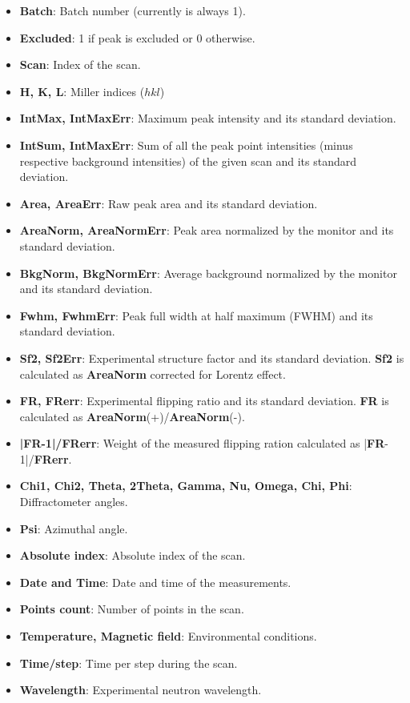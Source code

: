 \begin{itemize}
	\item \textbf{Batch}: Batch number (currently is always 1).
	\item \textbf{Excluded}: 1 if peak is excluded or 0 otherwise.
	\item \textbf{Scan}: Index of the scan.
	\item \textbf{H, K, L}: Miller indices ($hkl$)
	\item \textbf{IntMax, IntMaxErr}: Maximum peak intensity and its standard deviation.
	\item \textbf{IntSum, IntMaxErr}: Sum of all the peak point intensities (minus respective background intensities) of the given scan and its standard deviation.
	\item \textbf{Area, AreaErr}: Raw peak area and its standard deviation.
	\item \textbf{AreaNorm, AreaNormErr}: Peak area normalized by the monitor and its standard deviation.
	\item \textbf{BkgNorm, BkgNormErr}: Average background normalized by the monitor and its standard deviation.
	\item \textbf{Fwhm, FwhmErr}: Peak full width at half maximum (FWHM) and its standard deviation.
	\item \textbf{Sf2, Sf2Err}: Experimental structure factor and its standard deviation. \textbf{Sf2} is calculated as \textbf{AreaNorm} corrected for Lorentz effect.
	\item \textbf{FR, FRerr}: Experimental flipping ratio and its standard deviation. \textbf{FR} is calculated as \textbf{AreaNorm}(+)/\textbf{AreaNorm}(-).
	\item \textbf{|FR-1|/FRerr}: Weight of the measured flipping ration calculated as |\textbf{FR}-1|/\textbf{FRerr}.
	\item \textbf{Chi1, Chi2, Theta, 2Theta, Gamma, Nu, Omega, Chi, Phi}: Diffractometer angles.
	\item \textbf{Psi}: Azimuthal angle.
	\item \textbf{Absolute index}: Absolute index of the scan.
	\item \textbf{Date and Time}: Date and time of the measurements.
	\item \textbf{Points count}: Number of points in the scan.
	\item \textbf{Temperature, Magnetic field}: Environmental conditions.
	\item \textbf{Time/step}: Time per step during the scan.
	\item \textbf{Wavelength}: Experimental neutron wavelength.
\end{itemize}

